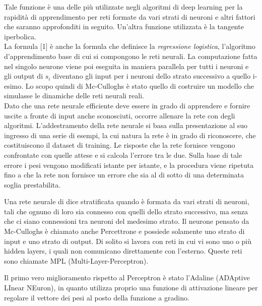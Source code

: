 Tale funzione è una delle più utilizzate negli algoritmi di deep learning per la rapidità di 
apprendimento per reti formate da vari strati di neuroni e altri fattori che saranno approfonditi in seguito. 
Un’altra funzione utilizzata è la tangente iperbolica.\\
La formula [1] è anche la formula che definisce la \emph{regressione logistica}, l’algoritmo d’apprendimento base di cui si compongono le
reti neurali.
La computazione fatta nel singolo neurone viene poi eseguita in maniera parallela per tutti 
i neuroni e gli output di \(s_i\) diventano gli input per i neuroni dello strato successivo a quello
 i-esimo. Lo scopo quindi di Mc-Culloghs è stato quello di costruire un modello che simulasse le dinamiche 
 delle reti neurali reali.\\
Dato che una rete neurale efficiente deve essere in grado di apprendere e fornire uscite a fronte di 
input anche sconosciuti, occorre allenare la rete con degli algoritmi. 
L’addestramento della rete neurale si basa sulla presentazione al suo ingresso di una serie di esempi,
 la cui natura la rete è in grado di riconoscere, che costituiscono il dataset di training. 
 Le risposte che la rete fornisce vengono confrontate con quelle attese e si calcola l’errore tra le due.
  Sulla base di tale errore i pesi vengono modificati istante per istante, e la procedura viene ripetuta
   fino a che la rete non fornisce un errore che sia al di sotto di una determinata soglia prestabilita.
     


Una rete neurale di dice stratificata quando è formata da vari strati di neuroni, 
tali che ognuno di loro sia connesso con quelli dello strato successivo, ma senza che ci 
siano connessioni tra neuroni del medesimo strato. 
Il neurone pensato da Mc-Culloghs è chiamato anche Percettrone e possiede solamente 
uno strato di input e uno strato di output.
Di solito si lavora con reti in cui vi sono uno o più hidden layers, 
i quali non comunicano direttamente con l’esterno. Queste reti sono chiamate MPL (Multi-Layer-Perceptron). 

Il primo vero miglioramento rispetto al Perceptron è stato l’Adaline (ADAptive LInear NEuron), 
in quanto utilizza proprio una funzione di attivazione lineare per regolare il vettore 
dei pesi al posto della funzione a gradino. \\

